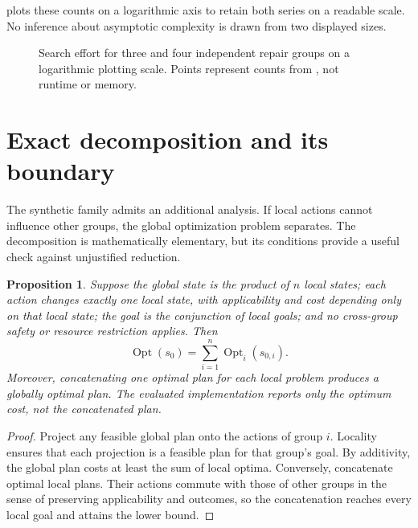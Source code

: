 \documentclass[11pt,a4paper]{article}
\newtheorem{proposition}{Proposition}
\newcommand{\Opt}{\operatorname{Opt}}
\begin{document}
 plots these counts on a logarithmic axis to retain both series on a readable scale. No inference about asymptotic complexity is drawn from two displayed sizes.
\begin{figure}[H]\centering
{}
\caption{Search effort for three and four independent repair groups on a logarithmic plotting scale. Points represent counts from , not runtime or memory.}\label{fig:scaling}
\end{figure}

\section{Exact decomposition and its boundary}
The synthetic family admits an additional analysis. If local actions cannot influence other groups, the global optimization problem separates. The decomposition is mathematically elementary, but its conditions provide a useful check against unjustified reduction.
\begin{proposition}\label{prop:decomp}
Suppose the global state is the product of $n$ local states; each action changes exactly one local state, with applicability and cost depending only on that local state; the goal is the conjunction of local goals; and no cross-group safety or resource restriction applies. Then
\begin{equation}\label{eq:decomp}\Opt(s_0)=\sum_{i=1}^{n}\Opt_i(s_{0,i}).\end{equation}
Moreover, concatenating one optimal plan for each local problem produces a globally optimal plan. The evaluated implementation reports only the optimum cost, not the concatenated plan.
\end{proposition}
\begin{proof}
Project any feasible global plan onto the actions of group $i$. Locality ensures that each projection is a feasible plan for that group's goal. By additivity, the global plan costs at least the sum of local optima. Conversely, concatenate optimal local plans. Their actions commute with those of other groups in the sense of preserving applicability and outcomes, so the concatenation reaches every local goal and attains the lower bound.
\end{proof}
\end{document}
